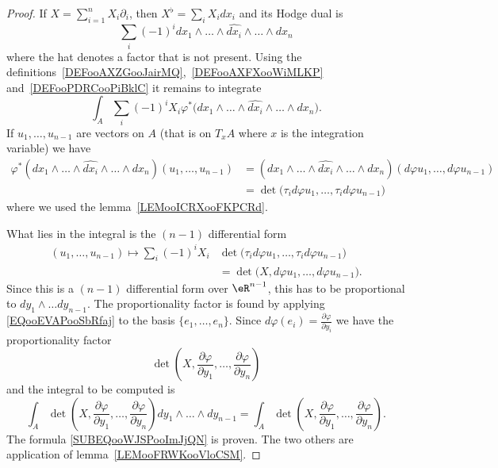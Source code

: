 \begin{proof}
    If \( X=\sum_{i=1}^nX_i\partial_i\), then \( X^{\flat}=\sum_{i}X_idx_i\) and its Hodge dual is
    \begin{equation}
        \sum_{i}(-1)^i dx_1\wedge\ldots\wedge\widehat{dx_i}\wedge\ldots\wedge dx_n
    \end{equation}
    where the hat denotes a factor that is not present. Using the definitions~\ref{DEFooAXZGooJairMQ},~\ref{DEFooAXFXooWiMLKP} and~\ref{DEFooPDRCooPiBklC} it remains to integrate
    \begin{equation}
        \int_A\sum_i(-1)^iX_i\varphi^*\big( dx_1\wedge\ldots\wedge\widehat{dx_i}\wedge\ldots\wedge dx_n \big).
    \end{equation}
    If \( u_1,\ldots, u_{n-1}\) are vectors on \( A\) (that is on \( T_xA\) where \( x\) is the integration variable) we have
    \begin{subequations}
        \begin{align}
            \varphi^*(dx_1\wedge\ldots\wedge \widehat{dx_i}\wedge\ldots\wedge dx_n)(u_1,\ldots, u_{n-1})&= (dx_1\wedge\ldots\wedge \widehat{dx_i}\wedge\ldots\wedge dx_n)(d\varphi u_1,\ldots, d\varphi u_{n-1})\\
            &=\det\big( \tau_id\varphi u_1,\ldots, \tau_id\varphi u_{n-1} \big)
        \end{align}
    \end{subequations}
    where we used the lemma~\ref{LEMooICRXooFKPCRd}.

    What lies in the integral is the \( (n-1)\) differential form
    \begin{subequations}        \label{EQooEVAPooSbRfaj}
        \begin{align}
           (u_1,\ldots, u_{n-1})\mapsto \sum_{i}(-1)^iX_i&\det\big(    \tau_id\varphi u_1,\ldots, \tau_id\varphi u_{n-1}  \big)\\
            &=\det\big( X,d\varphi u_1,\ldots, d\varphi u_{n-1} \big).
        \end{align}
    \end{subequations}
    Since this is a \( (n-1)\) differential form over \( \eR^{n-1}\), this has to be proportional to \( dy_1\wedge\ldots dy_{n-1}\). The proportionality factor is found by applying \eqref{EQooEVAPooSbRfaj} to the basis \( \{ e_1,\ldots, e_n \}\). Since \( d\varphi(e_i)=\frac{ \partial \varphi }{ \partial y_i }\) we have the proportionality factor
    \begin{equation}
        \det\left( X,\frac{ \partial \varphi }{ \partial y_1 },\ldots, \frac{ \partial \varphi }{ \partial y_n } \right)
    \end{equation}
    and the integral to be computed is
    \begin{equation}
        \int_A\det\left( X,\frac{ \partial \varphi }{ \partial y_1 },\ldots, \frac{ \partial \varphi }{ \partial y_n } \right)dy_1\wedge\ldots\wedge dy_{n-1}=\int_A\det\left( X,\frac{ \partial \varphi }{ \partial y_1 },\ldots, \frac{ \partial \varphi }{ \partial y_n } \right).
    \end{equation}
    The formula \eqref{SUBEQooWJSPooImJjQN} is proven. The two others are application of lemma~\ref{LEMooFRWKooVloCSM}.
\end{proof}

